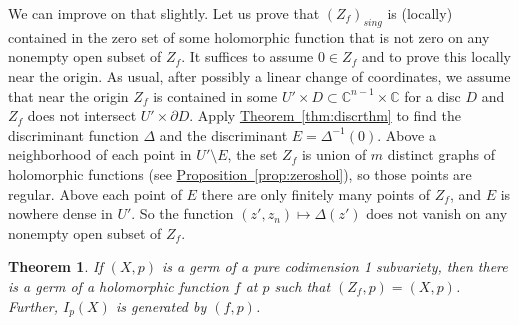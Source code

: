 \documentclass[12pt,openany]{book}
\newcommand{\C}{{\mathbb{C}}}
\theoremstyle{plain}
\newtheorem{thm}{Theorem}[section]
\theoremstyle{remark}
\theoremstyle{definition}
\theoremstyle{exercise}
\theoremstyle{example}
\newcommand{\thmref}[1]{\hyperref[#1]{Theorem~\ref*{#1}}}
\newcommand{\propref}[1]{\hyperref[#1]{Proposition~\ref*{#1}}}
\begin{document}
We can improve on that slightly.
Let us prove that $(Z_f)_{\mathit{sing}}$ is (locally) contained in the zero set of some holomorphic
function that is not zero on any nonempty open subset of $Z_f$.
It suffices to assume $0 \in Z_f$ and to prove this locally near the origin.
As usual, after possibly a linear change of coordinates, we assume
that near the origin $Z_f$ is contained in some $U' \times D \subset
\C^{n-1} \times \C$ for a disc $D$ and $Z_f$ does not
intersect $U' \times \partial D$.
Apply \thmref{thm:discrthm} to find
the discriminant function
$\Delta$ and the discriminant $E = \Delta^{-1}(0)$.
Above a neighborhood of each
point in $U' \setminus E$, the set $Z_f$ is union of $m$ distinct graphs
of holomorphic functions (see \propref{prop:zeroshol}), so those
points are regular.  Above
each point of $E$ there are only finitely many points of $Z_f$,
and $E$ is nowhere dense in $U'$.  So the
function $(z',z_n) \mapsto \Delta(z')$ does not vanish on any nonempty open
subset of $Z_f$.

\begin{thm} \label{thm:codim1var}
If $(X,p)$ is a germ of a pure codimension 1 subvariety, then
there is a germ of a holomorphic function $f$ at $p$
such that $(Z_f,p) = (X,p)$.  Further, $I_p(X)$ is generated by $(f,p)$.
\end{thm}
\end{document}
